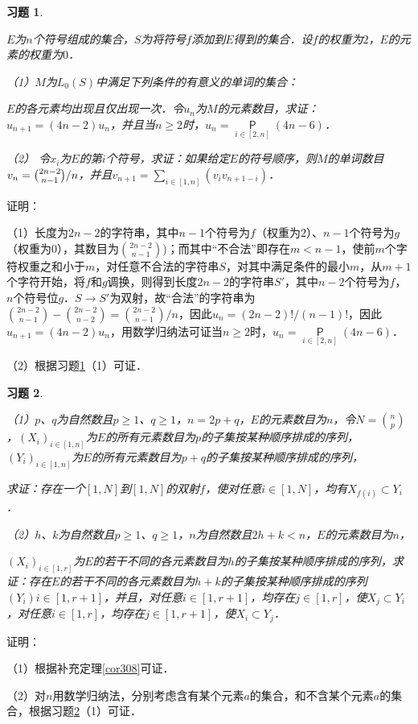 \documentclass[12pt, a4paper, oneside]{book}
\newtheorem{exer}{习题}
\begin{document}
			\begin{exer}\label{exer148}
				\hfill\par
				$E$为$n$个符号组成的集合，$S$为将符号$f$添加到$E$得到的集合．设$f$的权重为$2$，$E$的元素的权重为$0$．
				\par
				（1）$M$为$L_0(S)$中满足下列条件的有意义的单词的集合：
				\par
				$E$的各元素均出现且仅出现一次．令$u_n$为$M$的元素数目，求证：$u_{n+1}=(4n-2)u_n$，并且当$n\geq 2$时，$u_n=\mathop{\mathsf{P}}\limits_{i\in [2, n]}(4n-6)$．
				\par
				（2）	令$x_i$为$E$的第$i$个符号，求证：如果给定$E$的符号顺序，则$M$的单词数目$v_n=\\\binom{2n-2}{n-1}/n$，并且$v_{n+1}=\sum\limits_{i\in [1, n]}(v_iv_{n+1-i})$．
			\end{exer}
			证明：
			\par
			（1）长度为$2n-2$的字符串，其中$n-1$个符号为$f$（权重为$2$）、$n-1$个符号为$g$（权重为$0$），其数目为$\binom{2n-2}{n-1}$)；而其中“不合法”即存在$m<n-1$，使前$m$个字符权重之和小于$m$，对任意不合法的字符串$S$，对其中满足条件的最小$m$，从$m+1$个字符开始，将$f$和$g$调换，则得到长度$2n-2$的字符串$S'$，其中$n-2$个符号为$f$，$n$个符号位$g$．$S\to S'$为双射，故“合法”的字符串为$\binom{2n-2}{n-1}-\binom{2n-2}{n-2}=\binom{2n-2}{n-1}/n$，因此$u_n=(2n-2)!/(n-1)!$，因此$u_{n+1}=(4n-2)u_n$，用数学归纳法可证当$n\geq 2$时，$u_n=\mathop{\mathsf{P}}\limits_{i\in [2, n]}(4n-6)$．
			\par
			（2）根据习题\ref{exer148}（1）可证．
			
			\begin{exer}\label{exer149}
				\hfill\par
				（1）$p$、$q$为自然数且$p\geq 1$、$q\geq 1$，$n=2p+q$，$E$的元素数目为$n$，令$N=\binom{n}{p}$，$(X_i)_{i\in [1, n]}$为$E$的所有元素数目为$p$的子集按某种顺序排成的序列，$(Y_i)_{i\in [1, n]}$为$E$的所有元素数目为$p+q$的子集按某种顺序排成的序列，
				\par
				求证：存在一个$[1, N]$到$[1, N]$的双射$f$，使对任意$i\in [1, N]$，均有$X_{f(i)}\subset Y_i$．
				\par
				（2）$h$、$k$为自然数且$p\geq 1$、$q\geq 1$，$n$为自然数且$2h+k<n$，$E$的元素数目为$n$，
				\par
				$(X_i)_{i\in [1, r]}$为$E$的若干不同的各元素数目为$h$的子集按某种顺序排成的序列，求证：存在$E$的若干不同的各元素数目为$h+k$的子集按某种顺序排成的序列$(Y_i)i\in [1, r+1]$，并且，对任意$i\in [1, r+1]$，均存在$j\in [1, r]$，使$X_j\subset Y_i$，对任意$i\in [1, r]$，均存在$j\in [1, r+1]$，使$X_i\subset Y_j$．
			\end{exer}
			证明：
			\par
			（1）根据补充定理\ref{cor308}可证．
			\par
			（2）对$n$用数学归纳法，分别考虑含有某个元素$a$的集合，和不含某个元素$a$的集合，根据习题\ref{exer149}（1）可证．
						
\end{document}
